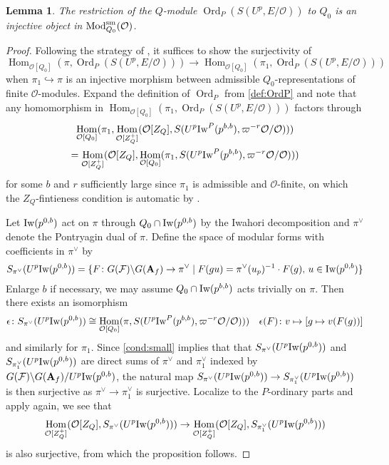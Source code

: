 \documentclass[leqno]{amsart}
\newtheorem{lem}[thm]{Lemma}
\theoremstyle{definition}
\theoremstyle{remark}
\newcommand{\oo}{\mathcal{O}}
\newcommand{\A}{\mathbf A}
\DeclareMathOperator{\Hom}{Hom}
\DeclareMathOperator{\Mod}{\textnormal{Mod}}
\DeclareMathOperator{\Ord}{Ord} %
\newcommand{\sm}{\textnormal{sm}}
\newcommand{\F}{{\mathcal{F}}} %
\newcommand{\Iw}{\textnormal{Iw}} %
\begin{document}
\begin{lem}\label{lem:inj}
	The restriction of the $Q$-module
	$\Ord_P(S(U^p,E/\oo))$ to $Q_0$ 
	is an injective object
	in $\Mod^{\sm}_{Q_0}(\oo)$.
\end{lem}
\begin{proof}
	Following the strategy of 
	\cite[Prop 3.2.4]{pan}, 
	it suffices to show the surjectivity of
	\[
		\Hom_{\oo[Q_0]}(\pi,\Ord_P(S(U^p,E/\oo)))\to 
		\Hom_{\oo[Q_0]}(\pi_1,\Ord_P(S(U^p,E/\oo)))
	\]
	when $\pi_{1}\hookrightarrow \pi$ 
	is an injective morphism between admissible 
    $Q_0$-representations of finite $\oo$-modules.
    Expand the definition of $\Ord_P$ from \eqref{def:OrdP}
    and note that any homomorphism  in 
    $\Hom_{\oo[Q_0]}(\pi_1,\Ord_P(S(U^p,E/\oo)))$ factors through
	\begin{multline*}
		\Hom_{\oo[Q_0]}(\pi_1,
		\Hom_{\oo[Z_Q^+]}
		(\oo[Z_Q], S(U^p\Iw^P(p^{b,b}),
		\varpi^{-r}\oo/\oo)))\\=
		\Hom_{\oo[Z_Q^+]}(\oo[Z_Q],
		\Hom_{\oo[Q_0]}(\pi_1, 
		S(U^p\Iw^P(p^{b,b}),\varpi^{-r}\oo/\oo)))
	\end{multline*}
	for some $b$ and $r$ sufficiently large
    since $\pi_1$ is admissible and $\oo$-finite,
	on which 
	the $Z_Q$-fintieness condition is automatic
	by \cite[Lem 3.1.5]{emeI}.

    Let $\Iw(p^{0,b})$ 
    act on $\pi$ through $Q_0\cap \Iw(p^{0,b})$
    by the Iwahori decomposition
    and $\pi^\vee$ denote the Pontryagin dual of $\pi$.
	Define the space of modular forms with
    coefficients in $\pi^\vee$ by
	\[
		S_{\pi^\vee}(U^p\Iw(p^{0,b}))=
		\{
			F\colon G(\F)\backslash G(\A_f)\to 
			\pi^\vee\mid 
			F(gu)=\pi^\vee(u_p)^{-1}\cdot F(g),\,
			u\in \Iw(p^{0,b})
		\}
	\]
	Enlarge $b$ if necessary, we may assume
	$Q_0\cap \Iw(p^{b,b})$ acts trivially on $\pi$.
	Then there exists an isomorphism
	\[
		\epsilon\colon 
		S_{\pi^\vee}(U^p\Iw(p^{0,b}))\cong 
		\Hom_{\oo[Q_0]}(\pi,
		S(U^p\Iw^P(p^{b,b}),\varpi^{-r}\oo/\oo)))
		\quad \epsilon(F)\colon
		v\mapsto [g\mapsto v(F(g))]
	\]
	and similarly for $\pi_1$.
    Since \eqref{cond:small} implies that
	that $S_{\pi^\vee}(U^p\Iw(p^{0,b}))$
	and $S_{\pi_1^\vee}(U^p\Iw(p^{0,b}))$
	are direct sums of 
	$\pi^\vee$ and  $\pi_1^\vee$
    indexed by
	$G(\F)\backslash G(\A_f)/U^p\Iw(p^{0,b})$,
    the natural map
	$S_{\pi^\vee}(U^p\Iw(p^{0,b}))\to 
	S_{\pi_1^\vee}(U^p\Iw(p^{0,b}))$ is then
	surjective
	as $\pi^\vee\to \pi_1^\vee$ is surjective.
	Localize to the $P$-ordinary parts
	and apply \cite[Lem 3.1.5]{emeI} again,
	we see that
	\[
		\Hom_{\oo[Z_Q^+]}(\oo[Z_Q],
		S_{\pi^\vee}(U^p\Iw(p^{0,b})))\to 
		\Hom_{\oo[Z_Q^+]}(\oo[Z_Q],
		S_{\pi^\vee_1}(U^p\Iw(p^{0,b})))
	\]
	is also surjective, from which 
	the proposition follows.
\end{proof}
\end{document}
